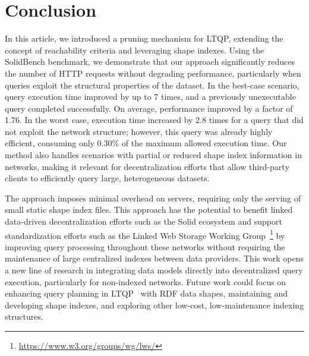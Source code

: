 \section{Conclusion}\label{sec:conclusion}

In this article, we introduced a pruning mechanism for LTQP, extending the concept of reachability criteria and leveraging shape indexes. 
Using the SolidBench benchmark, we demonstrate that our approach significantly reduces the number of HTTP requests without degrading performance, particularly when queries exploit the structural properties of the dataset.
In the best-case scenario, query execution time improved by up to 7 times, and a previously unexecutable query completed successfully.
On average, performance improved by a factor of 1.76.
In the worst case, execution time increased by 2.8 times for a query that did not exploit the network structure; however, this query was already highly efficient, consuming only 0.30\% of the maximum allowed execution time.
Our method also handles scenarios with partial or reduced shape index information in networks, making it relevant for decentralization efforts that allow third-party clients to efficiently query large, heterogeneous datasets.

The approach imposes minimal overhead on servers, requiring only the serving of small static shape index files. 
This approach has the potential to benefit linked data-driven decentralization efforts such as the Solid ecosystem and support standardization efforts such as the Linked Web Storage Working Group~\footnote{\url{https://www.w3.org/groups/wg/lws/}} by improving query processing throughout these networks without requiring the maintenance of large centralized indexes between data providers.
This work opens a new line of research in integrating data models directly into decentralized query execution, particularly for non-indexed networks. 
Future work could focus on enhancing query planning in LTQP~\cite{taelman2024towards} with RDF data shapes, 
maintaining and developing shape indexes, and exploring other low-cost, low-maintenance indexing structures.



